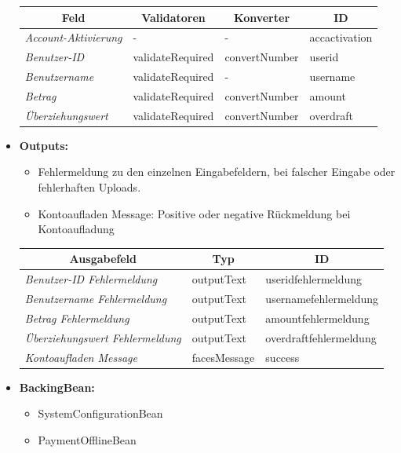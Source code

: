 \begin{itemize}
\begin{center}
\begin{longtable}{|p{3cm}| p{4cm}|p{3cm} |p{3cm}|}
						\hline \multicolumn{1}{|c|}{\textbf{Feld}} & \multicolumn{1}{|c|}{\textbf{Validatoren}}  &  \multicolumn{1}{|c|}{\textbf{Konverter}} &  \multicolumn{1}{|c|}{\textbf{ID}} \\ \hline
						\endfirsthead
						\hline
						\endlastfoot
						\textit{Account-Aktivierung} & - & - & accactivation\\ \hline
						\textit{Benutzer-ID} & validateRequired & convertNumber & userid\\ \hline
						\textit{Benutzername} & validateRequired & - & username\\ \hline
						\textit{Betrag} & validateRequired & convertNumber & amount \\ \hline
						\textit{Überziehungswert} & validateRequired & convertNumber & overdraft\\ \hline
					\end{longtable}
				\end{center}
			\item \textbf{Outputs:}
			\begin{itemize}
				\item Fehlermeldung zu den einzelnen Eingabefeldern, bei falscher Eingabe oder fehlerhaften Uploads.
				\item Kontoaufladen Message: Positive oder negative Rückmeldung bei Kontoaufladung
			\end{itemize}

					\begin{center}
						\begin{longtable}{|p{5cm} | p{3cm}|p{5cm}|}
							
							\hline \multicolumn{1}{|c|}{\textbf{Ausgabefeld}} & \multicolumn{1}{|c|}{\textbf{Typ}}  &  \multicolumn{1}{|c|}{\textbf{ID}} \\ \hline
							\endfirsthead
							\hline
							\endlastfoot
							\textit{Benutzer-ID Fehlermeldung}  & outputText & useridfehlermeldung \\ \hline
							\textit{Benutzername Fehlermeldung}  & outputText & usernamefehlermeldung \\ \hline
							\textit{Betrag Fehlermeldung} & outputText & amountfehlermeldung\\ \hline
							\textit{Überziehungswert Fehlermeldung} & outputText & overdraftfehlermeldung\\ \hline
							\textit{Kontoaufladen Message} & facesMessage & success\\ \hline
						\end{longtable}
					\end{center}
			\item \textbf{BackingBean:}
			\begin{itemize}
				\item SystemConfigurationBean
				\item PaymentOfflineBean
			\end{itemize}
		\end{itemize}
		
